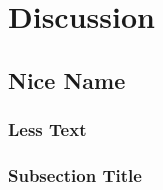 \chapter[DISCUSSION]{Discussion} \label{chap:discussion}
\pagestyle{myheadings}

\section{Nice Name}\label{sec:discussion_A}

\subsection{Less Text}\label{subsec:discussion_A_A}

\kant[4-9]  %
    
\subsection{Subsection Title}\label{subsec:discussion_A_B}

\kant[10-13]  %


%
